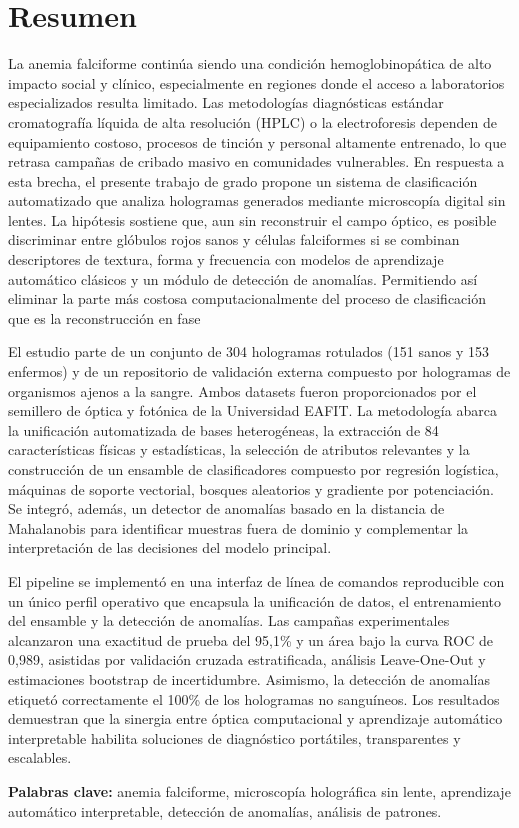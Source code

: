 \chapter*{Resumen}
La anemia falciforme continúa siendo una condición hemoglobinopática de alto impacto social y clínico, especialmente en regiones donde el acceso a laboratorios especializados resulta limitado. Las metodologías diagnósticas estándar cromatografía líquida de alta resolución (HPLC) o la electroforesis dependen de equipamiento costoso, procesos de tinción y personal altamente entrenado, lo que retrasa campañas de cribado masivo en comunidades vulnerables. En respuesta a esta brecha, el presente trabajo de grado propone un sistema de clasificación automatizado que analiza hologramas generados mediante microscopía digital sin lentes. La hipótesis sostiene que, aun sin reconstruir el campo óptico, es posible discriminar entre glóbulos rojos sanos y células falciformes si se combinan descriptores de textura, forma y frecuencia con modelos de aprendizaje automático clásicos y un módulo de detección de anomalías. Permitiendo así eliminar la parte más costosa computacionalmente del proceso de clasificación que es la reconstrucción en fase

El estudio parte de un conjunto de 304 hologramas rotulados (151 sanos y 153 enfermos) y de un repositorio de validación externa compuesto por hologramas de organismos ajenos a la sangre. Ambos datasets fueron proporcionados por el semillero de óptica y fotónica de la Universidad EAFIT. La metodología abarca la unificación automatizada de bases heterogéneas, la extracción de 84 características físicas y estadísticas, la selección de atributos relevantes y la construcción de un ensamble de clasificadores compuesto por regresión logística, máquinas de soporte vectorial, bosques aleatorios y gradiente por potenciación. Se integró, además, un detector de anomalías basado en la distancia de Mahalanobis para identificar muestras fuera de dominio y complementar la interpretación de las decisiones del modelo principal.

El pipeline se implementó en una interfaz de línea de comandos reproducible con un único perfil operativo que encapsula la unificación de datos, el entrenamiento del ensamble y la detección de anomalías. Las campañas experimentales alcanzaron una exactitud de prueba del 95,1\% y un área bajo la curva ROC de 0,989, asistidas por validación cruzada estratificada, análisis Leave-One-Out y estimaciones bootstrap de incertidumbre. Asimismo, la detección de anomalías etiquetó correctamente el 100\% de los hologramas no sanguíneos. Los resultados demuestran que la sinergia entre óptica computacional y aprendizaje automático interpretable habilita soluciones de diagnóstico portátiles, transparentes y escalables.

\textbf{Palabras clave:} anemia falciforme, microscopía holográfica sin lente, aprendizaje automático interpretable, detección de anomalías, análisis de patrones.
